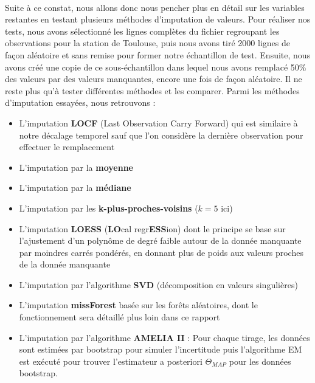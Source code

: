 \documentclass[14pt, openany]{article}
\begin{document}
\paragraph{}
Suite à ce constat, nous allons donc nous pencher plus en détail sur les variables restantes en testant plusieurs méthodes d'imputation de valeurs. Pour réaliser nos tests, nous avons sélectionné les lignes complètes du fichier regroupant les observations pour la station de Toulouse, puis nous avons tiré 2000 lignes de façon aléatoire et sans remise pour former notre échantillon de test. Ensuite, nous avons créé une copie de ce sous-échantillon dans lequel nous avons remplacé 50\% des valeurs par des valeurs manquantes, encore une fois de façon aléatoire. Il ne reste plus qu'à tester différentes méthodes et les comparer.
\newpage
Parmi les méthodes d'imputation essayées, nous retrouvons :
\begin{itemize}
\item L'imputation \textbf{LOCF} (Last Observation Carry Forward) qui est similaire à notre décalage temporel sauf que l'on considère la dernière observation pour effectuer le remplacement
\item L'imputation par la \textbf{moyenne}
\item L'imputation par la \textbf{médiane}
\item L'imputation par les \textbf{k-plus-proches-voisins} ($k=5$ ici)
\item L'imputation \textbf{LOESS} (\textbf{LO}cal regr\textbf{ESS}ion) dont le principe se base sur l'ajustement d'un polynôme de degré faible autour de la donnée manquante par moindres carrés pondérés, en donnant plus de poids aux valeurs proches de la donnée manquante
\item L'imputation par l'algorithme \textbf{SVD} (décomposition en valeurs singulières)
\item L'imputation \textbf{missForest} basée sur les forêts aléatoires, dont le fonctionnement sera détaillé plus loin dans ce rapport
\item L'imputation par l'algorithme \textbf{AMELIA II} : Pour chaque tirage, les données sont estimées par bootstrap pour simuler l'incertitude puis l'algorithme EM est exécuté pour trouver l'estimateur a posteriori $\Theta_{MAP}$ pour les données bootstrap.
\end{itemize}
\end{document}
